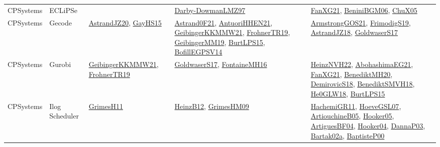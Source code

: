 {\begin{longtable}{lp{3cm}>{\raggedright}p{6cm}>{\raggedright}p{6cm}p{8cm}}
CPSystems & ECLiPSe &  & \href{articles/Darby-DowmanLMZ97.pdf}{Darby-DowmanLMZ97}\cite{Darby-DowmanLMZ97} & \href{articles/FanXG21.pdf}{FanXG21}\cite{FanXG21}, \href{papers/BeniniBGM06.pdf}{BeniniBGM06}\cite{BeniniBGM06}, \href{papers/ChuX05.pdf}{ChuX05}\cite{ChuX05}\\
CPSystems & Gecode & \href{articles/AstrandJZ20.pdf}{AstrandJZ20}\cite{AstrandJZ20}, \href{papers/GayHS15.pdf}{GayHS15}\cite{GayHS15} & \href{papers/Astrand0F21.pdf}{Astrand0F21}\cite{Astrand0F21}, \href{papers/AntuoriHHEN21.pdf}{AntuoriHHEN21}\cite{AntuoriHHEN21}, \href{papers/GeibingerKKMMW21.pdf}{GeibingerKKMMW21}\cite{GeibingerKKMMW21}, \href{papers/FrohnerTR19.pdf}{FrohnerTR19}\cite{FrohnerTR19}, \href{papers/GeibingerMM19.pdf}{GeibingerMM19}\cite{GeibingerMM19}, \href{papers/BurtLPS15.pdf}{BurtLPS15}\cite{BurtLPS15}, \href{papers/BofillEGPSV14.pdf}{BofillEGPSV14}\cite{BofillEGPSV14} & \href{papers/ArmstrongGOS21.pdf}{ArmstrongGOS21}\cite{ArmstrongGOS21}, \href{papers/FrimodigS19.pdf}{FrimodigS19}\cite{FrimodigS19}, \href{papers/AstrandJZ18.pdf}{AstrandJZ18}\cite{AstrandJZ18}, \href{papers/GoldwaserS17.pdf}{GoldwaserS17}\cite{GoldwaserS17}\\
CPSystems & Gurobi & \href{papers/GeibingerKKMMW21.pdf}{GeibingerKKMMW21}\cite{GeibingerKKMMW21}, \href{papers/FrohnerTR19.pdf}{FrohnerTR19}\cite{FrohnerTR19} & \href{papers/GoldwaserS17.pdf}{GoldwaserS17}\cite{GoldwaserS17}, \href{papers/FontaineMH16.pdf}{FontaineMH16}\cite{FontaineMH16} & \href{articles/HeinzNVH22.pdf}{HeinzNVH22}\cite{HeinzNVH22}, \href{articles/AbohashimaEG21.pdf}{AbohashimaEG21}\cite{AbohashimaEG21}, \href{articles/FanXG21.pdf}{FanXG21}\cite{FanXG21}, \href{articles/BenediktMH20.pdf}{BenediktMH20}\cite{BenediktMH20}, \href{papers/DemirovicS18.pdf}{DemirovicS18}\cite{DemirovicS18}, \href{papers/BenediktSMVH18.pdf}{BenediktSMVH18}\cite{BenediktSMVH18}, \href{papers/He0GLW18.pdf}{He0GLW18}\cite{He0GLW18}, \href{papers/BurtLPS15.pdf}{BurtLPS15}\cite{BurtLPS15}\\
CPSystems & Ilog Scheduler & \href{papers/GrimesH11.pdf}{GrimesH11}\cite{GrimesH11} & \href{papers/HeinzB12.pdf}{HeinzB12}\cite{HeinzB12}, \href{papers/GrimesHM09.pdf}{GrimesHM09}\cite{GrimesHM09} & \href{articles/HachemiGR11.pdf}{HachemiGR11}\cite{HachemiGR11}, \href{papers/HoeveGSL07.pdf}{HoeveGSL07}\cite{HoeveGSL07}, \href{papers/ArtiouchineB05.pdf}{ArtiouchineB05}\cite{ArtiouchineB05}, \href{articles/Hooker05.pdf}{Hooker05}\cite{Hooker05}, \href{papers/ArtiguesBF04.pdf}{ArtiguesBF04}\cite{ArtiguesBF04}, \href{papers/Hooker04.pdf}{Hooker04}\cite{Hooker04}, \href{papers/DannaP03.pdf}{DannaP03}\cite{DannaP03}, \href{papers/Bartak02a.pdf}{Bartak02a}\cite{Bartak02a}, \href{articles/BaptisteP00.pdf}{BaptisteP00}\cite{BaptisteP00}\\

\end{longtable}}

